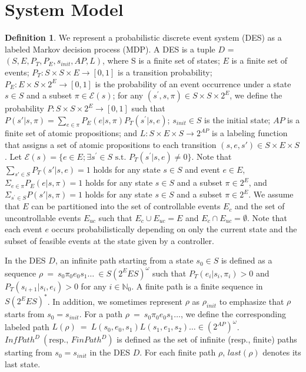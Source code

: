 \documentclass[10 pt, dvipdfmx]{article}
\theoremstyle{definition}
\newtheorem{definition}{Definition}[section]
\begin{document}
\section{System Model}

\begin{definition}
We represent a probabilistic discrete event system (DES) as a labeled Markov decision process (MDP). A DES is a tuple $D$ = $(S, E, P_T, P_E, s_{init}, AP, L)$, where S is a finite set of states; $E$ is a finite set of events; $P_T:S \times S \times E \rightarrow [0,1]$ is a transition probability; $P_E : E \times S \times 2^E \rightarrow [0,1]$ is the probability of an event occurrence under a state $s \in S$ and a subset $\pi \in \mathcal{E}(s)$; for any $(s^{\prime}, s, \pi) \in S \times S \times 2^E$, we define the probability $P : S \times S \times 2^{E} \rightarrow [0,1]$ such that $P(s'|s,\pi) = \sum_{e \in \pi}P_E(e|s,\pi) P_T(s^{\prime}|s,e)$; $s_{init} \in S$ is the initial state; $AP$ is a finite set of atomic propositions; and $L : S \times E \times S \rightarrow 2^{AP}$ is a labeling function that assigns a set of atomic propositions to each transition $(s, e, s') \in S \times E \times S$.
Let $\mathcal{E}(s) = \{ e \in E ; \exists s^{\prime} \in S \text{ s.t. } P_T (s^{\prime} | s, e) \neq 0 \}$.
Note that $\sum_{s' \in S} P_T(s'|s,e) = 1$ holds for any state $s \in S$ and event $e \in E$, $\Sigma_{e \in \pi} P_E(e|s,\pi) = 1$ holds for any state $s \in S$ and a subset $\pi \in 2^E$, and $\Sigma_{s^{\prime} \in S} P(s'|s,\pi) = 1$ holds for any state $s \in S$ and a subset $\pi \in 2^E$.
We assume that $E$ can be partitioned into the set of controllable events $E_c$ and the set of uncontrollable events $E_{uc}$ such that $E_c \cup E_{uc} = E$ and $E_c \cap E_{uc} = \emptyset$. Note that each event $e$ occurs probabilistically depending on only the current state and the subset of feasible events at the state given by a controller.

In the DES $D$, an infinite path starting from a state $s_0 \in S$ is defined as a sequence $\rho\ =\ s_0\pi_0e_0s_1 \ldots\ \in S (2^E E S)^{\omega}$ such that $P_T(e_{i}|s_i, \pi_i) > 0$ and $P_T(s_{i+1}|s_i, e_i) > 0$ for any $ i \in \mathbb{N}_0$. A finite path is a finite sequence in $S (2^E E S)^*$. In addition, we sometimes represent $\rho$ as $\rho_{init}$ to emphasize that $\rho$ starts from $s_0 = s_{init}$.
For a path $\rho\ =\ s_0\pi_0e_0s_1 \ldots$, we define the corresponding labeled path $L(\rho)\ =\ L(s_0,e_0,s_1)L(s_1,e_1,s_2) \ldots \in (2^{AP})^{\omega}$.
 $InfPath^{D}\ ( \text{resp., }FinPath^{D})$ is defined as the set of infinite (resp., finite) paths starting from $s_0=s_{init}$ in the DES $D$. For each finite path $\rho$, $last(\rho)$ denotes its last state.
\end{definition}
\end{document}
